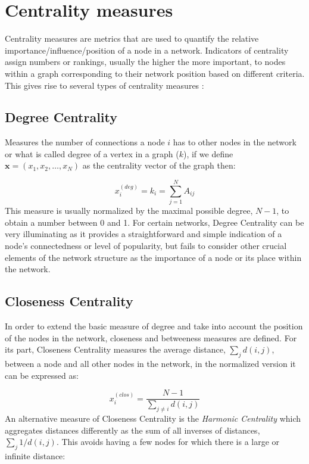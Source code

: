 \section{Centrality measures}
\label{sec:centra}
 Centrality measures are metrics that are used to quantify the relative importance/influence/position of a node in a network. Indicators of centrality assign numbers or rankings, usually the higher the more important, to nodes within a graph corresponding to their network position based on different criteria. This gives rise to several types of centrality measures \cite{newman2018networks}:

\subsection*{Degree Centrality} Measures the number of connections a node $i$ has to other nodes in the network or what is called degree of a vertex in a graph ($k$), if we define $\mathbf{x}=(x_1,x_2,\dots,x_N)$ as the centrality vector of the graph then: 

\begin{equation}
    x_i^{(deg)}=k_i=\sum_{j=1}^{N}A_{ij}
\end{equation}
This measure is usually normalized by the maximal possible degree, $N − 1$, to obtain a number between 0 and 1. For certain networks, Degree Centrality can be very illuminating as it provides a straightforward and simple indication of a node's connectedness or level of popularity, but fails to consider other crucial elements of the network structure as the importance of a node or its place within the network.

\subsection*{Closeness Centrality} In order to extend the basic measure of degree and take into account the position of the nodes in the network, closeness and betweeness measures are defined. For its part, Closeness Centrality measures the average distance, $\sum_{j}^{}d(i,j)$, between a node and all other nodes in the network, in the normalized version it can be expressed as:

\begin{equation}
    x_i^{(clos)}= \frac{N-1}{\sum_{j\ne i}^{}d(i,j)}
\end{equation}
An alternative measure of Closeness Centrality is the \textit{Harmonic Centrality} which aggregates distances differently as the sum of all inverses
of distances, $\sum_{j}^{}1/d(i,j)$. This avoids having a few nodes for which there is a large or infinite distance:

